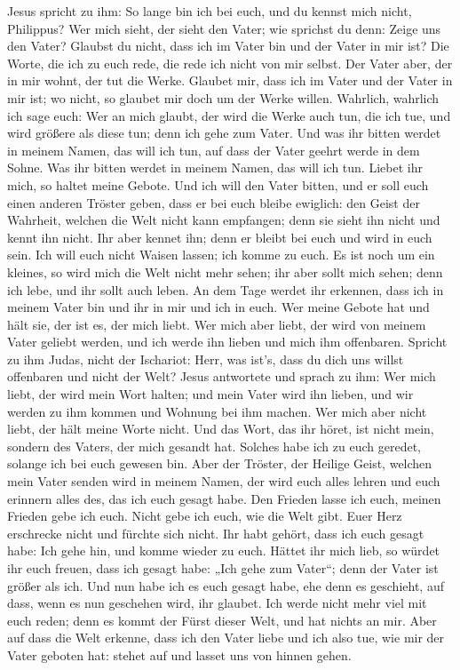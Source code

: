  Jesus spricht zu ihm: So lange bin ich bei euch, und du
kennst mich nicht, Philippus? Wer mich sieht, der sieht den Vater; wie
sprichst du denn: Zeige uns den Vater?  Glaubst du nicht,
dass ich im Vater bin und der Vater in mir ist? Die Worte, die ich zu
euch rede, die rede ich nicht von mir selbst. Der Vater aber, der in mir
wohnt, der tut die Werke.  Glaubet mir, dass ich im Vater
und der Vater in mir ist; wo nicht, so glaubet mir doch um der Werke
willen.  Wahrlich, wahrlich ich sage euch: Wer an mich
glaubt, der wird die Werke auch tun, die ich tue, und wird größere als
diese tun; denn ich gehe zum Vater.  Und was ihr bitten
werdet in meinem Namen, das will ich tun, auf dass der Vater geehrt
werde in dem Sohne.  Was ihr bitten werdet in meinem
Namen, das will ich tun.  Liebet ihr mich, so haltet
meine Gebote.  Und ich will den Vater bitten, und er soll
euch einen anderen Tröster geben, dass er bei euch bleibe ewiglich:
 den Geist der Wahrheit, welchen die Welt nicht kann
empfangen; denn sie sieht ihn nicht und kennt ihn nicht. Ihr aber kennet
ihn; denn er bleibt bei euch und wird in euch sein.  Ich
will euch nicht Waisen lassen; ich komme zu euch.  Es ist
noch um ein kleines, so wird mich die Welt nicht mehr sehen; ihr aber
sollt mich sehen; denn ich lebe, und ihr sollt auch leben.
 An dem Tage werdet ihr erkennen, dass ich in meinem
Vater bin und ihr in mir und ich in euch.  Wer meine
Gebote hat und hält sie, der ist es, der mich liebt. Wer mich aber
liebt, der wird von meinem Vater geliebt werden, und ich werde ihn
lieben und mich ihm offenbaren.  Spricht zu ihm Judas,
nicht der Ischariot: Herr, was ist's, dass du dich uns willst offenbaren
und nicht der Welt?  Jesus antwortete und sprach zu ihm:
Wer mich liebt, der wird mein Wort halten; und mein Vater wird ihn
lieben, und wir werden zu ihm kommen und Wohnung bei ihm machen.
 Wer mich aber nicht liebt, der hält meine Worte nicht.
Und das Wort, das ihr höret, ist nicht mein, sondern des Vaters, der
mich gesandt hat.  Solches habe ich zu euch geredet,
solange ich bei euch gewesen bin.  Aber der Tröster, der
Heilige Geist, welchen mein Vater senden wird in meinem Namen, der wird
euch alles lehren und euch erinnern alles des, das ich euch gesagt habe.
 Den Frieden lasse ich euch, meinen Frieden gebe ich
euch. Nicht gebe ich euch, wie die Welt gibt. Euer Herz erschrecke nicht
und fürchte sich nicht.  Ihr habt gehört, dass ich euch
gesagt habe: Ich gehe hin, und komme wieder zu euch. Hättet ihr mich
lieb, so würdet ihr euch freuen, dass ich gesagt habe: „Ich gehe zum
Vater``; denn der Vater ist größer als ich.  Und nun habe
ich es euch gesagt habe, ehe denn es geschieht, auf dass, wenn es nun
geschehen wird, ihr glaubet.  Ich werde nicht mehr viel
mit euch reden; denn es kommt der Fürst dieser Welt, und hat nichts an
mir.  Aber auf dass die Welt erkenne, dass ich den Vater
liebe und ich also tue, wie mir der Vater geboten hat: stehet auf und
lasset uns von hinnen gehen.

